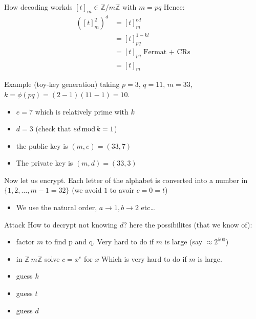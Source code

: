 \begin{parag}{ How decoding workds}
    $ \left[t\right]_m \in \mathbb{Z} / m \mathbb{Z} $ with $m = pq$ Hence:
    \begin{align*} \left(\left[t\right]_m^2\right)^d &= \left[t\right]_m^{ed}\\
    &= \left[t\right]_{pq}^{1 - kl}\\
    &=\left[t\right]_{pq} \text{ Fermat + CRs}\\
    &= \left[t\right]_m
    \end{align*}
    
\end{parag}
\begin{parag}{Example (toy-key generation)}
    taking $p = 3$, $q = 11$, $m = 33$, $k = \phi\left(pq\right) = \left(2-1\right)\left(11-1\right) = 10$.
    \begin{itemize}
        \item $e = 7$ which is relatively prime with $k$
        \item $d = 3$ (check that $ed \operatorname{mod} k = 1$)
        \item the public key is $\left(m, e\right) = \left(33, 7\right)$
        \item The private key is $\left(m, d\right) = \left(33, 3\right)$
    \end{itemize}
    
    Now let us encrypt. Each letter of the alphabet is converted into a number in $\{1, 2, \ldots, m-1 = 32\}$ (we avoid $1$ to avoir $c = 0 = t$)
    \begin{itemize}
        \item We use the natural order, $a \to 1, b \to 2$ etc\ldots
    \end{itemize}
    
    
\end{parag}
\begin{parag}{Attack}
    How to decrypt not knowing $d$? here the possibilites (that we know of):
    \begin{itemize}
        \item factor $m$ to find p and q. Very hard to do if $m$ is large (say $\approx 2^{500}$)
        \item in $\mathbb{Z} \ m \mathbb{Z}$ solve $c = x^e$ for $x$ Which is very hard to do if $m$ is large.
        \item guess $k$
        \item guess $t$
        \item guess $d$
    \end{itemize}
    
    
\end{parag}
